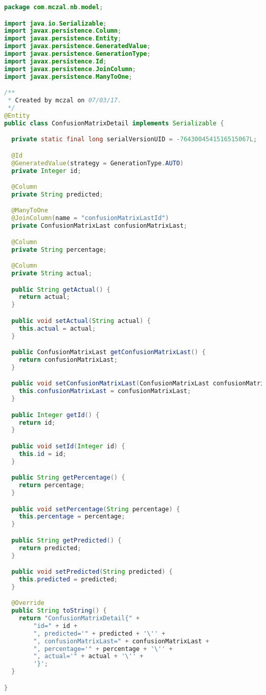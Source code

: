 \begin{lstlisting}[language=Java,basicstyle=\tiny,caption=ConfusionMatrixDetail.java]
package com.mczal.nb.model;

import java.io.Serializable;
import javax.persistence.Column;
import javax.persistence.Entity;
import javax.persistence.GeneratedValue;
import javax.persistence.GenerationType;
import javax.persistence.Id;
import javax.persistence.JoinColumn;
import javax.persistence.ManyToOne;

/**
 * Created by mczal on 07/03/17.
 */
@Entity
public class ConfusionMatrixDetail implements Serializable {

  private static final long serialVersionUID = -7643004541516515067L;

  @Id
  @GeneratedValue(strategy = GenerationType.AUTO)
  private Integer id;

  @Column
  private String predicted;

  @ManyToOne
  @JoinColumn(name = "confusionMatrixLastId")
  private ConfusionMatrixLast confusionMatrixLast;

  @Column
  private String percentage;

  @Column
  private String actual;

  public String getActual() {
    return actual;
  }

  public void setActual(String actual) {
    this.actual = actual;
  }

  public ConfusionMatrixLast getConfusionMatrixLast() {
    return confusionMatrixLast;
  }

  public void setConfusionMatrixLast(ConfusionMatrixLast confusionMatrixLast) {
    this.confusionMatrixLast = confusionMatrixLast;
  }

  public Integer getId() {
    return id;
  }

  public void setId(Integer id) {
    this.id = id;
  }

  public String getPercentage() {
    return percentage;
  }

  public void setPercentage(String percentage) {
    this.percentage = percentage;
  }

  public String getPredicted() {
    return predicted;
  }

  public void setPredicted(String predicted) {
    this.predicted = predicted;
  }

  @Override
  public String toString() {
    return "ConfusionMatrixDetail{" +
        "id=" + id +
        ", predicted='" + predicted + '\'' +
        ", confusionMatrixLast=" + confusionMatrixLast +
        ", percentage='" + percentage + '\'' +
        ", actual='" + actual + '\'' +
        '}';
  }

}

\end{lstlisting}


